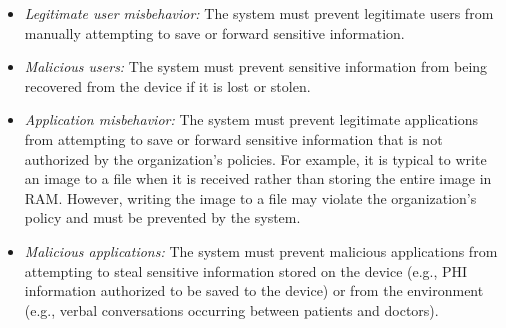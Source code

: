 \begin{itemize}
\item \textit{Legitimate user misbehavior:} The system must prevent 
legitimate users from manually attempting to save or forward
sensitive information.
\item \textit{Malicious users:} The system must prevent sensitive information
from being recovered from the device if it is lost or stolen.
\item \textit{Application misbehavior:} The system must prevent legitimate
applications from attempting to save or forward
sensitive information that is not authorized by the organization’s
policies. For example, it is typical to write an
image to a file when it is received rather than storing
the entire image in RAM. However, writing the image to
a file may violate the organization’s policy and must be
prevented by the system.
\item \textit{Malicious applications:} The system must prevent malicious
applications from attempting to steal sensitive
information stored on the device (e.g., PHI information
authorized to be saved to the device) or from the environment
(e.g., verbal conversations occurring between
patients and doctors).
\end{itemize}

